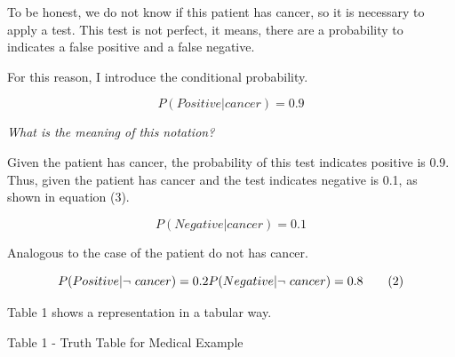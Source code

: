 \documentclass[]{book}
\begin{document}
To be honest, we do not know if this patient has cancer, so it is
necessary to apply a test. This test is not perfect, it means, there are
a probability to indicates a false positive and a false negative.

For this reason, I introduce the conditional probability.

\[ P(Positive | cancer) = 0.9 \tag{2}\]

\emph{What is the meaning of this notation?}

Given the patient has cancer, the probability of this test indicates
positive is 0.9. Thus, given the patient has cancer and the test
indicates negative is 0.1, as shown in equation (3).

\[ P(Negative | cancer) = 0.1 \tag{3}\]

Analogous to the case of the patient do not has cancer.

\[ P(Positive | \neg \ cancer) = 0.2 \\
   P(Negative | \neg \ cancer) = 0.8 \tag{2} \]

Table 1 shows a representation in a tabular way.

Table 1 - Truth Table for Medical Example
\end{document}
